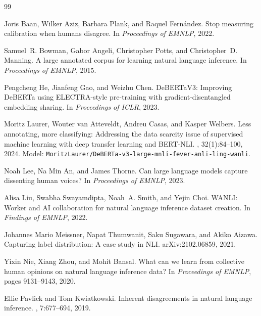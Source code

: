 \documentclass[11pt,a4paper]{article}
\begin{document}

\begin{thebibliography}{99}

Joris Baan, Wilker Aziz, Barbara Plank, and Raquel Fern\'andez.
\newblock Stop measuring calibration when humans disagree.
\newblock In {\em Proceedings of EMNLP}, 2022.

Samuel~R. Bowman, Gabor Angeli, Christopher Potts, and Christopher~D. Manning.
\newblock A large annotated corpus for learning natural language inference.
\newblock In {\em Proceedings of EMNLP}, 2015.

Pengcheng He, Jianfeng Gao, and Weizhu Chen.
\newblock DeBERTaV3: Improving DeBERTa using ELECTRA-style pre-training with gradient-disentangled embedding sharing.
\newblock In {\em Proceedings of ICLR}, 2023.

Moritz Laurer, Wouter van Atteveldt, Andreu Casas, and Kasper Welbers.
\newblock Less annotating, more classifying: Addressing the data scarcity issue of supervised machine learning with deep transfer learning and BERT-NLI.
, 32(1):84--100, 2024.
\newblock Model: \texttt{MoritzLaurer/DeBERTa-v3-large-mnli-fever-anli-ling-wanli}.

Noah Lee, Na Min An, and James Thorne.
\newblock Can large language models capture dissenting human voices?
\newblock In {\em Proceedings of EMNLP}, 2023.

Alisa Liu, Swabha Swayamdipta, Noah~A. Smith, and Yejin Choi.
\newblock WANLI: Worker and AI collaboration for natural language inference dataset creation.
\newblock In {\em Findings of EMNLP}, 2022.

Johannes Mario Meissner, Napat Thumwanit, Saku Sugawara, and Akiko Aizawa.
\newblock Capturing label distribution: A case study in NLI.
\newblock arXiv:2102.06859, 2021.

Yixin Nie, Xiang Zhou, and Mohit Bansal.
\newblock What can we learn from collective human opinions on natural language inference data?
\newblock In {\em Proceedings of EMNLP}, pages 9131--9143, 2020.

Ellie Pavlick and Tom Kwiatkowski.
\newblock Inherent disagreements in natural language inference.
, 7:677--694, 2019.


\end{thebibliography}
\end{document}
